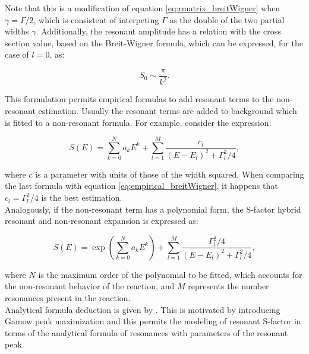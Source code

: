 \documentclass[openany]{book}
\begin{document}
 Note that this is a modification of equation \ref{eq:rmatrix_breitWigner} when $\gamma = \Gamma/2$, which is consistent of interpeting $\Gamma$ as the double of the two partial widths $\gamma$. Additionally, the resonant amplitude has a relation with the cross section value, based on the Breit-Wigner formula, which can be expressed, for the case of $l = 0$, as: 
 
 \begin{equation} \label{eq:empirical_breitWigner_S0}
 	S_0 \sim  \frac{\pi}{k^2}. 
 \end{equation}

This formulation permits empirical formulas to add resonant terms to the non-resonant estimation. Usually the resonant terms are added to background which is fitted to a non-resonant formula. For example, consider the expression: 

\begin{equation}  \label{eq:empirical_hybridPolynomial}
	S(E) =  \sum _{k = 0}^{N} {a_kE^k} + \sum_{l = 1}^{M} {\frac{c_l}{(E - E_l)^2 + \Gamma_l^2/4}},
\end{equation}

where $c$ is a parameter with units of those of the width squared. When comparing the last formula with equation \ref{eq:empirical_breitWigner}, it happens that $c_l = \Gamma^2_l/4$ is the best estimation. \\

Analogously, if the non-resonant term has a polynomial form, the S-factor hybrid resonant and non-resonant expansion is expressed as:

\begin{equation}  \label{eq:empirical_hybridExponential}
	S(E) =  \exp { \left( \sum _{k = 0}^{N} {a_kE^k} \right) } + \sum_{l = 1}^{M} {\frac{\Gamma_l^2/4}{(E - E_l)^2 + \Gamma_l^2/4}},
\end{equation}

where $N$ is the maximum order of the polynomial to be fitted, which accounts for the non-resonant behavior of the reaction, and $M$ represents the number resonances present in the reaction.  \\

Analytical formula deduction is given by \cite{kimura_bonasera_2013}. This is motivated by introducing Gamow peak maximization and this permits the modeling of resonant S-factor in terms of the analytical formula of resonances with parameters of the resonant peak. \\
\end{document}
